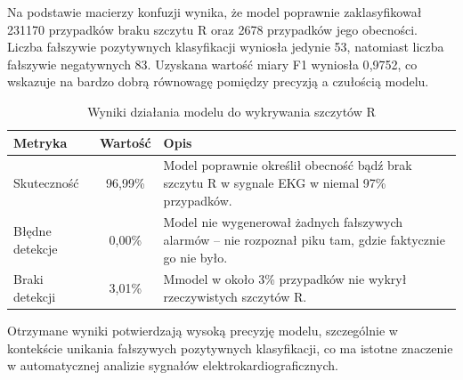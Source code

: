 \documentclass{article}
\begin{document}
Na podstawie macierzy konfuzji wynika, że model poprawnie zaklasyfikował 231170 przypadków braku szczytu R oraz 2678 przypadków jego obecności. Liczba fałszywie pozytywnych klasyfikacji wyniosła jedynie 53, natomiast liczba fałszywie negatywnych 83.
Uzyskana wartość miary F1 wyniosła 0{,}9752, co wskazuje na bardzo dobrą równowagę pomiędzy precyzją a czułością modelu. 


\begin{table}[h]
\centering
\begin{tabular}{|l|c|p{9cm}|}
\hline
\textbf{Metryka} & \textbf{Wartość} & \textbf{Opis} \\
\hline
Skuteczność & 96{,}99\% & Model poprawnie określił obecność bądź brak szczytu R w sygnale EKG w niemal 97\% przypadków. \\
\hline
Błędne detekcje & 0{,}00\% & Model nie wygenerował żadnych fałszywych alarmów – nie rozpoznał piku tam, gdzie faktycznie go nie było. \\
\hline
Braki detekcji  & 3{,}01\% &Mmodel w około 3\% przypadków nie wykrył rzeczywistych szczytów R. \\
\hline
\end{tabular}
\caption{Wyniki działania modelu do wykrywania szczytów R}
\end{table}

Otrzymane wyniki potwierdzają wysoką precyzję modelu, szczególnie w kontekście unikania fałszywych pozytywnych klasyfikacji, co ma istotne znaczenie w automatycznej analizie sygnałów elektrokardiograficznych.

\newpage
\end{document}
